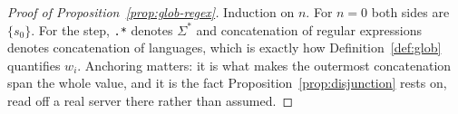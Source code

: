 \begin{proof}[Proof of Proposition~\ref{prop:glob-regex}]
Induction on $n$. For $n=0$ both sides are $\{s_0\}$. For the step, \texttt{.*} denotes
$\Sigma^{*}$ and concatenation of regular expressions denotes concatenation of languages,
which is exactly how Definition~\ref{def:glob} quantifies $w_i$. Anchoring matters: it is
what makes the outermost concatenation span the whole value, and it is the fact
Proposition~\ref{prop:disjunction} rests on, read off a real server there rather than
assumed.
\end{proof}
